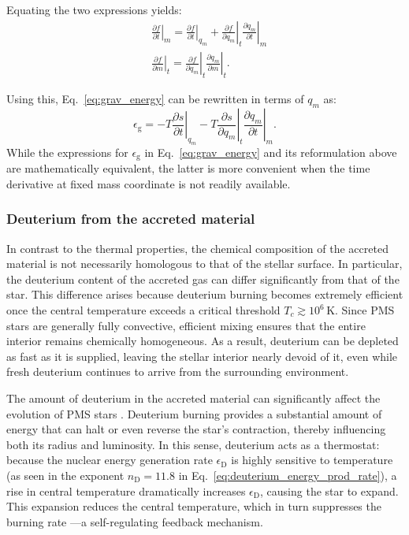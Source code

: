 \documentclass[12pt,a4paper]{article}
\newcommand{\mr}{\mathrm}
\newcommand{\pfird}[2][]{\frac{\partial#1}{\partial#2}}
\begin{document}
Equating the two expressions yields:
\begin{align}
  &\left.\pfird[f]{t}\right|_m = \left.\pfird[f]{t}\right|_{q_m} + \left.\pfird[f]{q_m}\right|_t \left.\pfird[q_m]{t}\right|_m \label{eq:coord_transf1}\\
  &\left.\pfird[f]{m}\right|_t = \left.\pfird[f]{q_m}\right|_t\left.\pfird[q_m]{m}\right|_t. \label{eq:coord_transf2}
\end{align}

Using this, Eq.~\eqref{eq:grav_energy} can be rewritten in terms of $q_m$ as:
\begin{equation}
   \epsilon_\mr{g} = -T \left.\pfird[s]{t}\right|_{q_m} - T \left.\pfird[s]{q_m}\right|_t\left.\pfird[q_m]{t}\right|_m.
\end{equation}
While the expressions for $\epsilon_\mr{g}$ in Eq.~\eqref{eq:grav_energy} and its reformulation above are mathematically equivalent, the latter is more convenient when the time derivative at fixed mass coordinate is not readily available.

\subsubsection{Deuterium from the accreted material}
\label{sec:deuterium_burning}

In contrast to the thermal properties, the chemical composition of the accreted material is not necessarily homologous to that of the stellar surface. In particular, the deuterium content of the accreted gas can differ significantly from that of the star. This difference arises because deuterium burning becomes extremely efficient once the central temperature exceeds a critical threshold $T_c \gtrsim 10^6\,\mr{K}$. Since PMS stars are generally fully convective, efficient mixing ensures that the entire interior remains chemically homogeneous. As a result, deuterium can be depleted as fast as it is supplied, leaving the stellar interior nearly devoid of it, even while fresh deuterium continues to arrive from the surrounding environment.

The amount of deuterium in the accreted material can significantly affect the evolution of PMS stars \parencite[e.g.,][]{KunitomoEtAl2017,AmardMatt2023}. Deuterium burning provides a substantial amount of energy that can halt or even reverse the star's contraction, thereby influencing both its radius and luminosity. In this sense, deuterium acts as a thermostat: because the nuclear energy generation rate $\epsilon_\mr{D}$ is highly sensitive to temperature (as seen in the exponent $n_\mr{D} = 11.8$ in Eq.~\eqref{eq:deuterium_energy_prod_rate}), a rise in central temperature dramatically increases $\epsilon_\mr{D}$, causing the star to expand. This expansion reduces the central temperature, which in turn suppresses the burning rate \parencite{StahlerPalla2004}—a self-regulating feedback mechanism.
\end{document}
